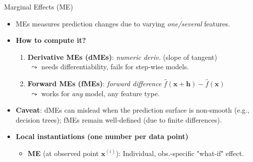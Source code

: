 \documentclass[10pt,compress,t,notes=noshow, xcolor=table]{beamer}
\begin{document}



\begin{frame}{Marginal Effects (ME)   }

\begin{itemize}\setlength\itemsep{0.45em}

\item %
MEs measures prediction changes due to varying \emph{one/several} features.
 
\item \textbf{How to compute it?}  
      \begin{enumerate}%
        \item \textbf{Derivative MEs (dMEs)}: \emph{numeric deriv.} (slope of tangent) \\
              \(\;\leadsto\) needs differentiability, fails for step-wise models.
        \item \textbf{Forward MEs (fMEs)}: \emph{forward difference} \(\hat f(\boldsymbol x+\boldsymbol h)-\hat f(\boldsymbol x)\)  \\
        
              \(\;\leadsto\) works for \emph{any} model, any feature type.
      \end{enumerate}

\item \textbf{Caveat}: dMEs can mislead when the prediction surface is non-smooth (e.g., decision trees); fMEs remain well-defined (due to finite differences).

\pause
\item \textbf{Local instantiations (one number per data point)}  
\begin{itemize}
  \item \textbf{ME} (at observed point $\boldsymbol{x}^{(i)}$):  
        Individual, obs.-specific "what-if" effect.


\end{itemize}
\end{itemize}
\end{frame}
\end{document}
